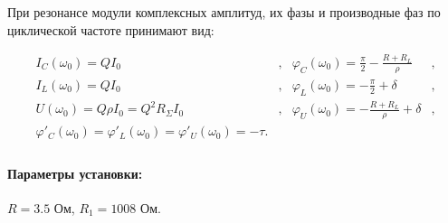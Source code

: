 \documentclass[a4paper,12pt]{article}
\begin{document}
При резонансе модули комплексных амплитуд, их фазы и производные фаз по циклической частоте принимают вид:

\begin{equation}
\begin{array}{llll}
I_C(\omega_0) = QI_0 & , & \varphi_C(\omega_0) = \frac{\pi}{2} - \frac{R + R_L}{\rho} & , \\

I_L(\omega_0) = QI_0 & , & \varphi_L(\omega_0) = - \frac{\pi}{2} + \delta & , \\

U(\omega_0) = Q\rho I_0 = Q^2 R_\Sigma I_0  & , & \varphi_U (\omega_0) = -  \frac{R + R_L}{\rho} + \delta & , \\

\varphi'_C (\omega_0) = \varphi'_L (\omega_0) = \varphi'_U(\omega_0) = -\tau . \\

\end{array}
\end{equation}

\paragraph{Параметры установки:} $R = 3.5$ Ом, $R_1 = 1008$ Ом.
\end{document}
